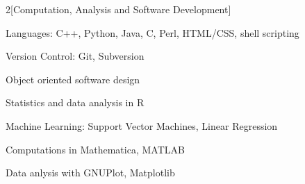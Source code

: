 \documentclass[11pt]{article}
\begin{document}
\begin{multicols}{2}[Computation, Analysis and Software Development]
\begin{compactitem}
\item Languages: C++, Python, Java, C, Perl, HTML/CSS, shell scripting
\item Version Control: Git, Subversion 
\item Object oriented software design
\item Statistics and data analysis in R
\item Machine Learning: Support Vector Machines, Linear Regression
\item Computations in Mathematica, MATLAB
\item Data anlysis with GNUPlot, Matplotlib 
\end{compactitem} 
\end{multicols}

\end{document}
